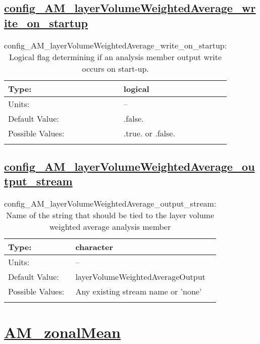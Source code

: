\subsection[config\_AM\_layerVolumeWeightedAverage\_write\_on\_startup]{\hyperref[sec:nm_tab_AM_layerVolumeWeightedAverage]{config\_AM\_layerVolumeWeightedAverage\_write\_on\_startup}}
\label{subsec:nm_sec_config_AM_layerVolumeWeightedAverage_write_on_startup}
\begin{center}
\begin{longtable}{| p{2.0in} || p{4.0in} |}
    \hline
    Type: & logical \\
    \hline
    Units: & -- \\
    \hline
    Default Value: & .false. \\
    \hline
    Possible Values: & .true. or .false. \\
    \hline
    \caption{config\_AM\_layerVolumeWeightedAverage\_write\_on\_startup: Logical flag determining if an analysis member output write occurs on start-up.}
\end{longtable}
\end{center}
\subsection[config\_AM\_layerVolumeWeightedAverage\_output\_stream]{\hyperref[sec:nm_tab_AM_layerVolumeWeightedAverage]{config\_AM\_layerVolumeWeightedAverage\_output\_stream}}
\label{subsec:nm_sec_config_AM_layerVolumeWeightedAverage_output_stream}
\begin{center}
\begin{longtable}{| p{2.0in} || p{4.0in} |}
    \hline
    Type: & character \\
    \hline
    Units: & -- \\
    \hline
    Default Value: & layerVolumeWeightedAverageOutput \\
    \hline
    Possible Values: & Any existing stream name or 'none' \\
    \hline
    \caption{config\_AM\_layerVolumeWeightedAverage\_output\_stream: Name of the string that should be tied to the layer volume weighted average analysis member}
\end{longtable}
\end{center}
\section[AM\_zonalMean]{\hyperref[sec:nm_tab_AM_zonalMean]{AM\_zonalMean}}
\label{sec:nm_sec_AM_zonalMean}
